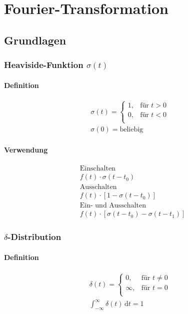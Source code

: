 \chapter{Fourier-Transformation}
\section{Grundlagen}
\subsection{Heaviside-Funktion $\sigma(t)$}
\subsubsection{Definition}
\begin{align}
	\sigma(t) = \begin{cases}
				1, & \text{für } t > 0\\
				0, & \text{für } t < 0\\
			\end{cases}\\
	\sigma(0) = \text{beliebig} \nonumber
\end{align}

\subsubsection{Verwendung}
\begin{align}
	&\text{Einschalten}\\\nonumber
	&f(t)\cdot\sigma(t-t_0)\\
	&\text{Ausschalten}\\\nonumber
	&f(t)\cdot\left[1-\sigma(t-t_0)\right]\\
	&\text{Ein- und Ausschalten}\\\nonumber
	&f(t)\cdot\left[\sigma(t-t_0) - \sigma(t-t_1)\right]
\end{align}

\subsection{$\delta$-Distribution}

\subsubsection{Definition}
\begin{align}
	\delta(t) = \begin{cases}
				0, & \text{für } t \neq 0\\
				\infty, & \text{für } t = 0\\
			\end{cases}\\
	\int_{-\infty}^\infty\!\delta(t)\,\mathrm{d}t = 1 \nonumber
\end{align}

